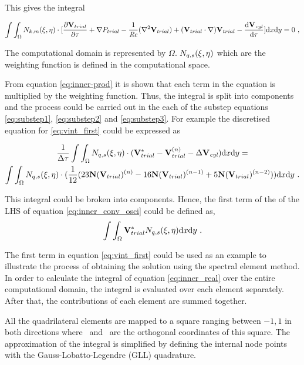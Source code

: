 This gives the integral 

 \begin{equation} \centering
 \label{eq:inner-prod}
 \int\int_{\Omega}N_{k,m}(\compone,\comptwo)\cdot[\pderiv{\Vtrial}{\tau} +\grad{\Ptrial} - \frac{1}{\Rey}(\gradsq{\Vtrial}) + (\Vtrial\cdot\nabla)\Vtrial - \accframe]\mathrm{d}x\mathrm{d}y = 0 ~,
 \end{equation}
 
The computational domain is represented by $\Omega$. $N_{q,s}(\xi,\eta)$ which are the weighting function is defined in the computational space.

From equation \ref{eq:inner-prod} it is shown that each term in the equation is multiplied by the weighting function. Thus, the integral is split into components and the process could be carried out in the each of the substep equations \ref{eq:substep1}, \ref{eq:substep2} and \ref{eq:substep3}. For example the discretised equation for \ref{eq:vint_first} could be expressed as

\setlength{\multlinegap}{0.2\textwidth}
\begin{multline} 
\label{eq:inner_conv_osci}
\frac{1}{\Delta\tau}\int\int_{\Omega}N_{q,s}(\xi,\eta)\cdot(\mathbf{V}_{trial}^{*} - \mathbf{V}_{trial}^{(n)} - \Delta\mathbf{V}_{\mathit{cyl}})\mathrm{d}x\mathrm{d}y = \\
\int\int_{\Omega}N_{q,s}(\xi,\eta)\cdot(\frac{1}{12}(23\mathbf{N}(\mathbf{V}_{trial})^{(n)} - 16\mathbf{N}(\mathbf{V}_{trial})^{(n-1)} + 5\mathbf{N}(\mathbf{V}_{trial})^{(n-2)}))\mathrm{d}x\mathrm{d}y ~.
\end{multline}

 This integral could be broken into components. Hence, the first term of the of the LHS of equation \ref{eq:inner_conv_osci} could be defined as,  
\begin{equation} \centering
\label{eq:inner_real}
\int\int_{\Omega}\Vtrial^{*} N_{q,s}(\compone,\comptwo)\mathrm{d}x\mathrm{d}y ~.
\end{equation}


The first term in equation \ref{eq:vint_first} could be used as an example to illustrate the process of obtaining the solution using the spectral element method. In order to calculate the integral of equation \ref{eq:inner_real}  over the entire computational domain, the integral is evaluated over each element separately. After that, the contributions of each element are summed together. 

All the quadrilateral elements are mapped to a square ranging between $-1,1$ in both directions where \compone\ and \comptwo\ are the orthogonal coordinates of this square. The approximation of the integral is simplified by defining the internal node points with the Gauss-Lobatto-Legendre (GLL) quadrature.


